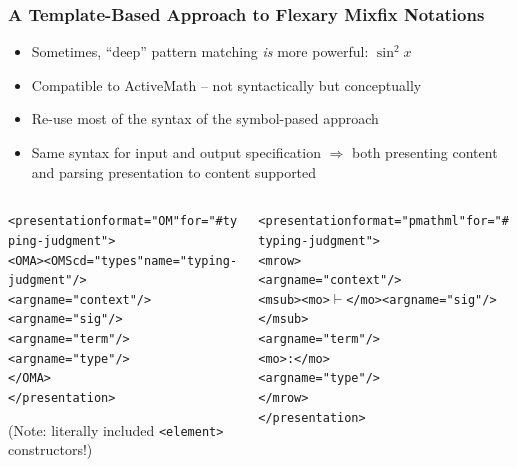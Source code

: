 \documentclass[pdftex,xcolor=svgnames]{beamer}
\begin{document}
\begin{frame}[fragile]
  \frametitle{A Template-Based Approach to Flexary Mixfix Notations}
  \begin{itemize}
  \item Sometimes, ``deep'' pattern matching \emph{is} more powerful: $\sin^2 x$
  \item Compatible to ActiveMath -- not syntactically but conceptually
  \item Re-use most of the syntax of the symbol-pased approach
  \item Same syntax for input and output specification $\Rightarrow$ both
    presenting content and parsing presentation to content supported {\large \smiley}
  \end{itemize}
  \begin{columns}[T]
    \begin{column}{.5\textwidth}
      {\tiny
\begin{alltt}
<presentation \textcolor[HTML]{3232B1}{format="OM"} \textcolor{DarkRed!75}{for="#typing-judgment"}>
  <OMA><OMS cd="types" \textcolor{DarkRed!75}{name="typing-judgment"}/>
    \textcolor{DarkGoldenrod!75}{<arg name="context"/>}
    \textcolor{DarkGreen!75}{<arg name="sig"/>}
    \textcolor{DeepPink!75}{<arg name="term"/>}
    \textcolor{violet!75}{<arg name="type"/>}
  </OMA>
</presentation>
\end{alltt}}
        (Note: literally included \texttt{<element>} constructors!)
      \end{column}
      \begin{column}{.5\textwidth}
      {\tiny
\begin{alltt}
<presentation \textcolor[HTML]{3232B1}{format="pmathml"} \textcolor{DarkRed!75}{for="#typing-judgment"}>
  <mrow>
    \textcolor{DarkGoldenrod!75}{<arg name="context"/>}
    <msub><mo>\(\vdash\)</mo>\textcolor{DarkGreen!75}{<arg name="sig"/>}</msub>
    \textcolor{DeepPink!75}{<arg name="term"/>}
    <mo>:</mo>
    \textcolor{violet!75}{<arg name="type"/>}
  </mrow>
</presentation>
\end{alltt}}
      \end{column}
    \end{columns}
\end{frame}
\end{document}
